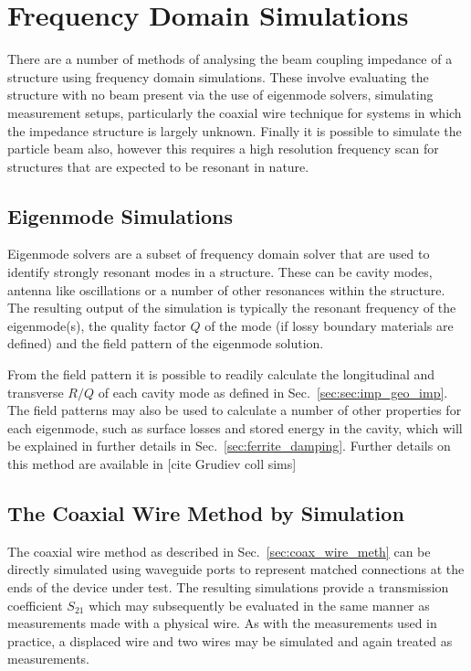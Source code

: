\section{Frequency Domain Simulations}

There are a number of methods of analysing the beam coupling impedance of a structure using frequency domain simulations. These involve evaluating the structure with no beam present via the use of eigenmode solvers, simulating measurement setups, particularly the coaxial wire technique for systems in which the impedance structure is largely unknown. Finally it is possible to simulate the particle beam also, however this requires a high resolution frequency scan for structures that are expected to be resonant in nature.

\subsection{Eigenmode Simulations}

Eigenmode solvers are a subset of frequency domain solver that are used to identify strongly resonant modes in a structure. These can be cavity modes, antenna like oscillations or a number of other resonances within the structure. The resulting output of the simulation is typically the resonant frequency of the eigenmode(s), the quality factor $Q$ of the mode (if lossy boundary materials are defined) and the field pattern of the eigenmode solution.

From the field pattern it is possible to readily calculate the longitudinal and transverse $R/Q$ of each cavity mode as defined in Sec.~\ref{sec:sec:imp_geo_imp}. The field patterns may also be used to calculate a number of other properties for each eigenmode, such as surface losses and stored energy in the cavity, which will be explained in further details in Sec.~\ref{sec:ferrite_damping}. Further details on this method are available in [cite Grudiev coll sims]

\subsection{The Coaxial Wire Method by Simulation}

The coaxial wire method as described in Sec.~\ref{sec:coax_wire_meth} can be directly simulated using waveguide ports to represent matched connections at the ends of the device under test. The resulting simulations provide a transmission coefficient $S_{21}$ which may subsequently be evaluated in the same manner as measurements made with a physical wire. As with the measurements used in practice, a displaced wire and two wires may be simulated and again treated as measurements. 

